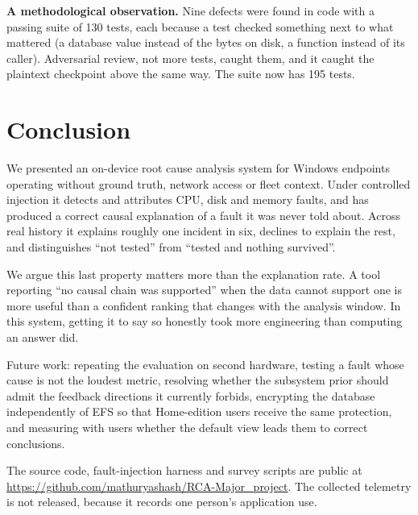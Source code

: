 \documentclass[conference]{IEEEtran}
\begin{document}
\textbf{A methodological observation.} Nine defects were found in code with a
passing suite of 130 tests, each because a test checked something next to what
mattered (a database value instead of the bytes on disk, a function instead of
its caller). Adversarial review, not more tests, caught them, and it caught
the plaintext checkpoint above the same way. The suite now has 195 tests.

\section{Conclusion}

We presented an on-device root cause analysis system for Windows endpoints
operating without ground truth, network access or fleet context. Under
controlled injection it detects and attributes CPU, disk and memory faults, and
has produced a correct causal explanation of a fault it was never told about.
Across real history it explains roughly one incident in six, declines to
explain the rest, and distinguishes ``not tested'' from ``tested and nothing
survived''.

We argue this last property matters more than the explanation rate. A tool
reporting ``no causal chain was supported'' when the data cannot support one is
more useful than a confident ranking that changes with the analysis window.
In this system, getting it to say so honestly took more engineering than
computing an answer did.

Future work: repeating the evaluation on second hardware, testing a fault whose
cause is not the loudest metric, resolving whether the subsystem prior should
admit the feedback directions it currently forbids, encrypting the database
independently of EFS so that Home-edition users receive the same protection,
and measuring with users whether the default view leads them to correct
conclusions.

The source code, fault-injection harness and survey scripts are public at
\url{https://github.com/mathuryashash/RCA-Major_project}. The collected
telemetry is not released, because it records one person's application use.
\end{document}
